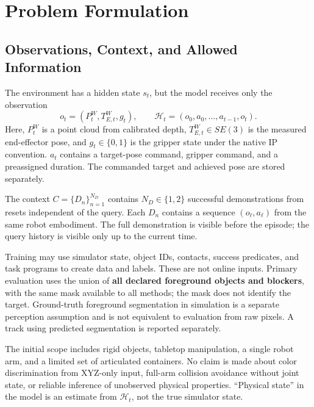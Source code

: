 \documentclass[
  10pt,
]{article}
\begin{document}
\hypertarget{phuxe1t-biux1ec3u-buxe0i-touxe1n}{%
\section{Problem Formulation}\label{phuxe1t-biux1ec3u-buxe0i-touxe1n}}

\hypertarget{quan-suxe1t-context-vuxe0-thuxf4ng-tin-ux111ux1b0ux1ee3c-phuxe9p}{%
\subsection{Observations, Context, and Allowed Information}\label{quan-suxe1t-context-vuxe0-thuxf4ng-tin-ux111ux1b0ux1ee3c-phuxe9p}}

The environment has a hidden state \(s_t\), but the model receives only the observation
\begin{equation}\label{eq:obs}
o_t=(P_t^W,T_{E,t}^W,g_t),\qquad
\mathcal H_t=(o_0,a_0,\ldots,a_{t-1},o_t).
\end{equation}
Here, \(P_t^W\) is a point cloud from calibrated depth, \(T_{E,t}^W\in SE(3)\) is the measured end-effector pose, and \(g_t\in\{0,1\}\) is the gripper state under the native IP convention. \(a_t\) contains a target-pose command, gripper command, and a preassigned duration. The commanded target and achieved pose are stored separately.

The context \(C=\{D_n\}_{n=1}^{N_D}\) contains \(N_D\in\{1,2\}\) successful demonstrations from resets independent of the query. Each \(D_n\) contains a sequence \((o_\ell,a_\ell)\) from the same robot embodiment. The full demonstration is visible before the episode; the query history is visible only up to the current time.

Training may use simulator state, object IDs, contacts, success predicates, and task programs to create data and labels. These are not online inputs. Primary evaluation uses the union of \textbf{all declared foreground objects and blockers}, with the same mask available to all methods; the mask does not identify the target. Ground-truth foreground segmentation in simulation is a separate perception assumption and is not equivalent to evaluation from raw pixels. A track using predicted segmentation is reported separately.

The initial scope includes rigid objects, tabletop manipulation, a single robot arm, and a limited set of articulated containers. No claim is made about color discrimination from XYZ-only input, full-arm collision avoidance without joint state, or reliable inference of unobserved physical properties. ``Physical state'' in the model is an estimate from \(\mathcal H_t\), not the true simulator state.
\end{document}
